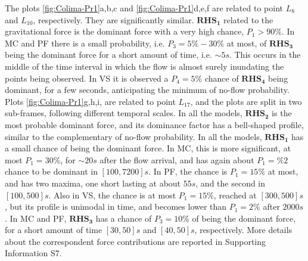 \documentclass{article}
\begin{document}
The plots \ref{fig:Colima-Pr1}a,b,c and \ref{fig:Colima-Pr1}d,e,f are related to point $L_8$ and $L_{10}$, respectively. They are significantly similar. $\boldsymbol{RHS_1}$ related to the gravitational force is the dominant force with a very high chance, $P_1>90\%$. In MC and PF there is a small probability, i.e. $P_3=5\%-30\%$ at most, of $\boldsymbol{RHS_3}$ being the dominant force for a short amount of time, i.e. $\sim 5 s$. This occurs in the middle of the time interval in which the flow is almost surely inundating the points being observed. In VS it is observed a $P_4=5\%$ chance of $\boldsymbol{RHS_4}$ being dominant, for a few seconds, anticipating the minimum of no-flow probability. Plots \ref{fig:Colima-Pr1}g,h,i, are related to point $L_{17}$, and the plots are split in two sub-frames, following different temporal scales. In all the models, $\boldsymbol{RHS_2}$ is the most probable dominant force, and its dominance factor has a bell-shaped profile, similar to the complementary of no-flow probability. In all the models, $\boldsymbol{RHS_1}$ has a small chance of being the dominant force. In MC, this is more significant, at most $P_1=30\%$, for $\sim 20 s$ after the flow arrival, and has again about $P_1=\%2$ chance to be dominant in $[100, 7200] s$. In PF, the chance is $P_1=15\%$ at most, and has two maxima, one short lasting at about $55 s$, and the second in $[100,500] s$. Also in VS, the chance is at most $P_1=15\%$, reached at $[300, 500] s$, but its profile is unimodal in time, and becomes lower than $P_1=2\%$ after $2000 s$. In MC and PF, $\boldsymbol{RHS_3}$ has a chance of $P_3=10\%$ of being the dominant force, for a short amount of time $[30, 50] s$ and $[40, 50] s$, respectively. More details about the correspondent force contributions are reported in Supporting Information S7.
\end{document}
